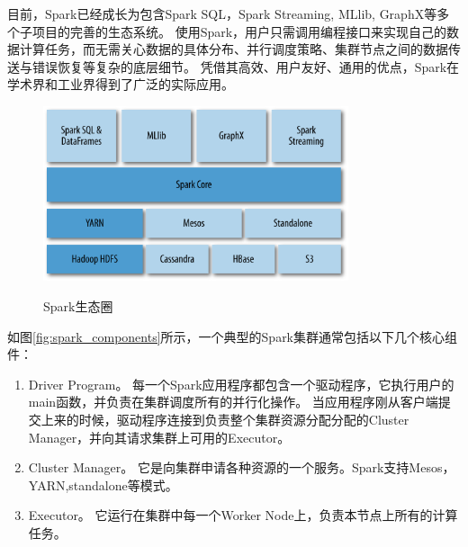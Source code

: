 \documentclass[master]{njuthesis}
\begin{document}
目前，Spark已经成长为包含Spark SQL，Spark Streaming, MLlib, GraphX等多个子项目的完善的生态系统。
使用Spark，用户只需调用编程接口来实现自己的数据计算任务，而无需关心数据的具体分布、并行调度策略、集群节点之间的数据传送与错误恢复等复杂的底层细节。
凭借其高效、用户友好、通用的优点，Spark在学术界和工业界得到了广泛的实际应用。
\begin{figure}[h]
  \centering
  \includegraphics[width= 0.8\textwidth]{figure/spark_ssstack.png}\\
  \caption{Spark生态圈}
  \label{fig:spark_stack}
\end{figure}

如图\ref{fig:spark_components}所示，一个典型的Spark集群通常包括以下几个核心组件：
\begin{enumerate}
 \item Driver Program。 每一个Spark应用程序都包含一个驱动程序，它执行用户的main函数，并负责在集群调度所有的并行化操作。
当应用程序刚从客户端提交上来的时候，驱动程序连接到负责整个集群资源分配分配的Cluster Manager，并向其请求集群上可用的Executor。 
\item Cluster Manager。 它是向集群申请各种资源的一个服务。Spark支持Mesos，YARN,standalone等模式。
\item Executor。 它运行在集群中每一个Worker Node上，负责本节点上所有的计算任务。

\end{enumerate}
\end{document}

